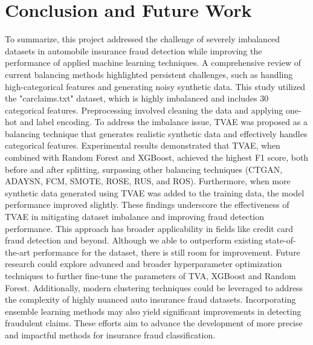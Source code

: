 \documentclass[twoside,11pt]{article}
\begin{document}
\section{Conclusion and Future Work}  \label{sec:conclusion}
To summarize, this project addressed the challenge of severely imbalanced datasets in automobile insurance fraud detection while improving the performance of applied machine learning techniques. A comprehensive review of current balancing methods highlighted persistent challenges, such as handling high-categorical features and generating noisy synthetic data. This study utilized the "carclaims.txt" dataset, which is highly imbalanced and includes 30 categorical features. Preprocessing involved cleaning the data and applying one-hot and label encoding. To address the imbalance issue, TVAE was proposed as a balancing technique that generates realistic synthetic data and effectively handles categorical features. Experimental results demonstrated that TVAE, when combined with Random Forest and XGBoost, achieved the highest F1 score, both before and after splitting, surpassing other balancing techniques (CTGAN, ADAYSN, FCM, SMOTE, ROSE, RUS, and ROS). Furthermore, when more synthetic data generated using TVAE was added to the training data, the model performance improved slightly. These findings underscore the effectiveness of TVAE in mitigating dataset imbalance and improving fraud detection performance. This approach has broader applicability in fields like credit card fraud detection and beyond.
Although we able to outperform existing state-of-the-art performance for the dataset, there is still room for improvement. Future research could explore advanced and broader hyperparameter optimization techniques to further fine-tune the parameters of TVA, XGBoost and Random Forest. Additionally, modern clustering techniques could be leveraged to address the complexity of highly nuanced auto insurance fraud datasets. Incorporating ensemble learning methods may also yield significant improvements in detecting fraudulent claims. These efforts aim to advance the development of more precise and impactful methods for insurance fraud classification. 



\vskip 0.2in

\end{document}
